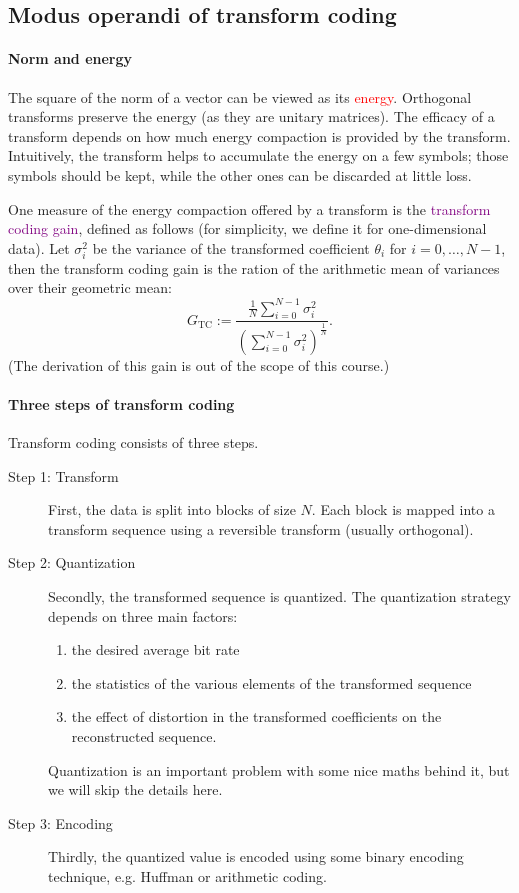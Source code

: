 \documentclass[a4paper, 11pt, openany]{book}
\numberwithin{equation}{section}
\theoremstyle{plain}
\theoremstyle{definition}
\newcommand{\Important}[1]{\textcolor{red}{#1}}
\newcommand{\Define}[1]{\textcolor{purple}{#1}}
\begin{document}
\subsection{Modus operandi of transform coding}


\paragraph{Norm and energy} 
The square of the norm of a vector can be viewed as its \Important{energy}. Orthogonal transforms preserve the energy (as they are unitary matrices). The efficacy of a transform depends on how much energy compaction is provided by the transform. Intuitively, the transform helps to accumulate the energy on a few symbols; those symbols should be kept, while the other ones can be discarded at little loss. 

One measure of the energy compaction offered by a transform is the \Define{transform coding gain}, defined as follows (for simplicity, we define it for one-dimensional data). Let $\sigma_i^2$ be the variance of the transformed coefficient $\theta_i$ for $i=0, \dots, N-1$, then the transform coding gain is the ration of the arithmetic mean of variances over their geometric mean:
\[
    G_{\mathrm{TC}} := \frac{ \frac{1}{N} \sum_{i=0}^{N-1} \sigma_i^2 }{ \left(\sum_{i=0}^{N-1} \sigma_i^2 \right)^{\frac{1}{N}} }.
\]
(The derivation of this gain is out of the scope of this course.)


\paragraph{Three steps of transform coding}
Transform coding consists of three steps.
\begin{description}
\item[Step 1: Transform] First, the data is split into blocks of size $N$. Each block is mapped into a transform sequence using a reversible transform (usually orthogonal).

\item[Step 2: Quantization] Secondly, the transformed sequence is quantized. The quantization strategy depends on three main factors:
\begin{enumerate}
    \item the desired average bit rate
    
    \item the statistics of the various elements of the transformed sequence
    
    \item the effect of distortion in the transformed coefficients on the reconstructed sequence.
\end{enumerate}
Quantization is an important problem with some nice maths behind it, but we will skip the details here.

\item[Step 3: Encoding] Thirdly, the quantized value is encoded using some binary encoding technique, e.g. Huffman or arithmetic coding.
\end{description}
\end{document}
